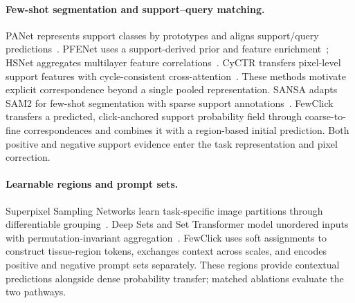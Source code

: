 \paragraph{Few-shot segmentation and support--query matching.}
PANet represents support classes by prototypes and aligns support/query predictions~\cite{wang2019panet}. PFENet uses a support-derived prior and feature enrichment~\cite{tian2022pfenet}; HSNet aggregates multilayer feature correlations~\cite{min2021hsnet}. CyCTR transfers pixel-level support features with cycle-consistent cross-attention~\cite{zhang2021cyctr}. These methods motivate explicit correspondence beyond a single pooled representation. SANSA adapts SAM2 for few-shot segmentation with sparse support annotations~\cite{cuttano2025sansa}. FewClick transfers a predicted, click-anchored support probability field through coarse-to-fine correspondences and combines it with a region-based initial prediction. Both positive and negative support evidence enter the task representation and pixel correction.

\paragraph{Learnable regions and prompt sets.}
Superpixel Sampling Networks learn task-specific image partitions through differentiable grouping~\cite{jampani2018ssn}. Deep Sets and Set Transformer model unordered inputs with permutation-invariant aggregation~\cite{zaheer2017deepsets,lee2019settransformer}. FewClick uses soft assignments to construct tissue-region tokens, exchanges context across scales, and encodes positive and negative prompt sets separately. These regions provide contextual predictions alongside dense probability transfer; matched ablations evaluate the two pathways.
